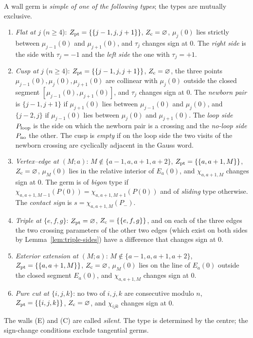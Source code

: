 \begin{definition}\label{def:walls}\leanok
A wall germ is \emph{simple of one of the following types}; the types are
mutually exclusive.
\begin{enumerate}
\item[(F)] \emph{Flat at $j$} ($n\geq4$): $Z_{\rm pt}=\{\{j-1,j,j+1\}\}$,
$Z_{\rm c}=\varnothing$, $\mu_j(0)$ lies strictly between $\mu_{j-1}(0)$ and
$\mu_{j+1}(0)$, and $\tau_j$ changes sign at $0$. The \emph{right side} is the
side with $\tau_j=-1$ and the \emph{left side} the one with $\tau_j=+1$.
\item[(K)] \emph{Cusp at $j$} ($n\geq4$): $Z_{\rm pt}=\{\{j-1,j,j+1\}\}$,
$Z_{\rm c}=\varnothing$, the three points $\mu_{j-1}(0),\mu_j(0),\mu_{j+1}(0)$
are collinear with $\mu_j(0)$ outside the closed segment
$[\mu_{j-1}(0),\mu_{j+1}(0)]$, and $\tau_j$ changes sign at $0$. The
\emph{newborn pair} is $\{j-1,j+1\}$ if $\mu_{j+1}(0)$ lies between
$\mu_{j-1}(0)$ and $\mu_j(0)$, and $\{j-2,j\}$ if $\mu_{j-1}(0)$ lies between
$\mu_j(0)$ and $\mu_{j+1}(0)$. The \emph{loop side} $P_{\rm loop}$ is the side
on which the newborn pair is a crossing and the \emph{no-loop side}
$P_{\rm no}$ the other. The cusp is
\emph{empty} if on the loop side the two visits of the newborn crossing are
cyclically adjacent in the Gauss word.
\item[(V)] \emph{Vertex--edge at $(M;a)$}: $M\notin\{a-1,a,a+1,a+2\}$,
$Z_{\rm pt}=\{\{a,a+1,M\}\}$, $Z_{\rm c}=\varnothing$, $\mu_M(0)$ lies in the
relative interior of $E_a(0)$, and $\chi_{a,a+1,M}$ changes sign at $0$. The
germ is of \emph{bigon} type if $\chi_{a,a+1,M-1}(P(0))=\chi_{a,a+1,M+1}(P(0))$
and of \emph{sliding} type otherwise. The \emph{contact sign} is
$s=\chi_{a,a+1,M}(P_-)$.
\item[(T)] \emph{Triple at $\{e,f,g\}$}: $Z_{\rm pt}=\varnothing$,
$Z_{\rm c}=\{\{e,f,g\}\}$, and on each of the three edges the two crossing
parameters of the other two edges (which exist on both sides by
Lemma~\ref{lem:triple-sides}) have a difference that changes sign at $0$.
\item[(E)] \emph{Exterior extension at $(M;a)$}: $M\notin\{a-1,a,a+1,a+2\}$,
$Z_{\rm pt}=\{\{a,a+1,M\}\}$, $Z_{\rm c}=\varnothing$, $\mu_M(0)$ lies on the
line of $E_a(0)$ outside the closed segment $E_a(0)$, and $\chi_{a,a+1,M}$
changes sign at $0$.
\item[(C)] \emph{Pure cut at $\{i,j,k\}$}: no two of $i,j,k$ are consecutive
modulo $n$, $Z_{\rm pt}=\{\{i,j,k\}\}$, $Z_{\rm c}=\varnothing$, and
$\chi_{ijk}$ changes sign at $0$.
\end{enumerate}
The walls (E) and (C) are called \emph{silent}. The type is determined by the
centre; the sign-change conditions exclude tangential germs.
\end{definition}

